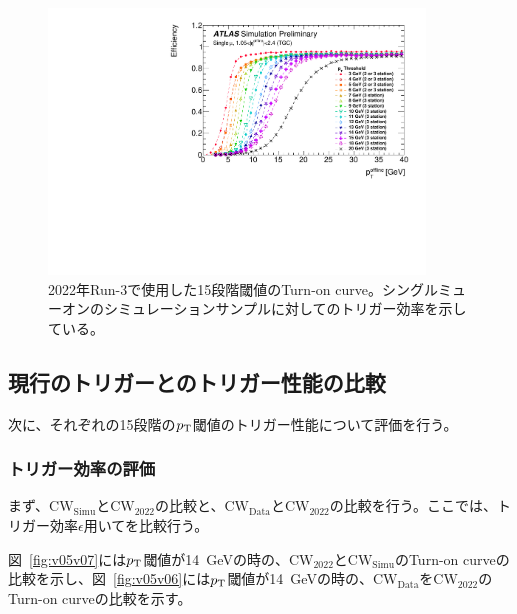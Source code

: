 \begin{figure}[tb]
  \centering
  \includegraphics[clip, width=10cm]{fig/3/PLOT-TRIG-2020-01-fig1.pdf}
  \caption{2022年Run-3で使用した15段階閾値のTurn-on curve。シングルミューオンのシミュレーションサンプルに対してのトリガー効率を示している。}
  \label{fig:Run3_15_MC5}
\end{figure}

\subsection{現行のトリガーとのトリガー性能の比較}
次に、それぞれの15段階の$p_{\rm{T}}$閾値のトリガー性能について評価を行う。

\subsubsection{トリガー効率の評価}
まず、$\mathrm{CW_{Simu}}$と$\mathrm{CW_{2022}}$の比較と、$\mathrm{CW_{Data}}$と$\mathrm{CW_{2022}}$の比較を行う。ここでは、トリガー効率$\epsilon$用いてを比較行う。

図~\ref{fig:v05v07}には$p_{\rm{T}}$閾値が14~GeVの時の、$\mathrm{CW_{2022}}$と$\mathrm{CW_{Simu}}$のTurn-on curveの比較を示し、図~\ref{fig:v05v06}には$p_{\rm{T}}$閾値が14~GeVの時の、$\mathrm{CW_{Data}}$を$\mathrm{CW_{2022}}$のTurn-on curveの比較を示す。

